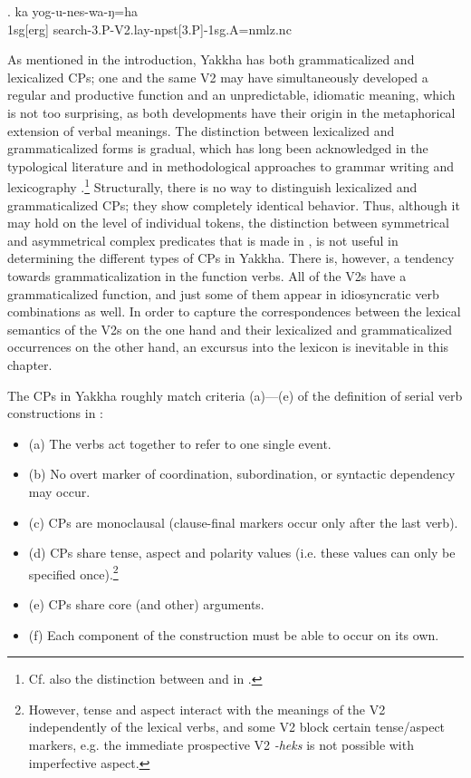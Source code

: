 \exg. ka yog-u-nes-wa-ŋ=ha\\ 
{\sc 1sg[erg]} search{\sc -3.P-V2.lay-npst[3.P]-1sg.A=nmlz.nc}\\ 
	 


 As mentioned in the introduction, Yakkha has both grammaticalized and lexicalized CPs; one and the same V2 may have simultaneously developed a regular and productive function and an unpredictable, idiomatic meaning, which is not too surprising, as both developments have their origin in the metaphorical extension of verbal meanings. The distinction between lexicalized and grammaticalized forms is gradual, which has long been acknowledged in the typological literature  \citep{Lehmann2002_Thoughts, Diewald2010_Some, Lichtenberk1991_Gradualness, Himmelmann2004_Lexicalization} and in methodological approaches to grammar writing and lexicography \citep{Schultze-Berndt2006_Taking, Mosel2006_Grammaticography, Enfield2006_Heterosemy}.\footnote{Cf. also the distinction between  and  in \citet{Svensen2009_Handbook}.} Structurally, there is no way to distinguish lexicalized and grammaticalized CPs; they show completely identical behavior. Thus, although it may hold on the level of individual tokens, the distinction between symmetrical and asymmetrical complex predicates that is made in \citet{Aikhenvald2006_Serial},  is not useful in determining the different types of CPs in Yakkha. There is, however, a tendency towards grammaticalization in the function verbs. All of the V2s have a grammaticalized function, and just some of them appear in idiosyncratic verb combinations as well. In order to capture the correspondences between the lexical semantics of the V2s on the one hand and their lexicalized and grammaticalized occurrences on the other hand, an excursus into the lexicon is inevitable in this chapter. 
 
The CPs in Yakkha roughly match criteria (a)—(e) of the definition of serial verb constructions in \citet[1]{Aikhenvald2006_Serial}: 


\begin{itemize}
\item (a) The verbs act together to refer to one single event.
\item (b) No overt marker of coordination, subordination, or syntactic dependency may occur.
\item (c) CPs are monoclausal (clause-final markers occur only after the last verb).
\item (d) CPs share tense, aspect and polarity values (i.e. these values can only be specified once).\footnote{However, tense and aspect interact with the meanings of the V2 independently of the lexical verbs, and some V2 block certain tense/aspect markers, e.g. the immediate prospective V2 \emph{-heks}  is not possible with imperfective aspect.}
\item (e) CPs share core (and other) arguments.
\item (f) Each component of the construction must be able to occur on its own.
\end{itemize}



